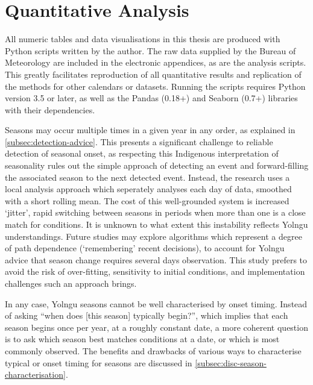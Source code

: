 \section{Quantitative Analysis}

All numeric tables and data visualisations in this thesis are produced
with Python scripts written by the author.  The raw data supplied by the
Bureau of Meteorology are included in the electronic appendices, as
are the analysis scripts.  This greatly facilitates reproduction of all
quantitative results and replication of the methods for other calendars
or datasets.  Running the scripts requires Python version 3.5 or later,
as well as the Pandas (0.18+) and Seaborn (0.7+) libraries with their
dependencies.

Seasons may occur multiple times in a given year in any order, as explained
in \cref{subsec:detection-advice}.  This presents a significant
challenge to reliable detection of seasonal onset, as respecting this
Indigenous interpretation of seasonality rules out
the simple approach of detecting an event and forward-filling the
associated season to the next detected event.  Instead, the research
uses a local analysis approach which seperately analyses each day of data,
smoothed with a short rolling mean.
%
The cost of this well-grounded system is increased `jitter', rapid
switching between seasons in periods when more than one is a close match
for conditions.  It is unknown to what extent this instability reflects Yolngu understandings.
%
Future studies may explore algorithms which represent a degree of path
dependence (`remembering' recent decisions), to account for Yolngu advice
that season change requires
several days observation.  This study prefers to avoid the risk of
over-fitting, sensitivity to initial conditions, and implementation
challenges such an approach brings.

In any case, Yolngu seasons cannot be well characterised by onset timing.
Instead of asking ``when does [this season] typically begin?'', which implies
that each season begins once per year, at a roughly constant date, a more
coherent question is to ask which season best matches conditions at a date,
or which is most commonly observed.
%
The benefits and drawbacks of various ways to characterise typical or onset
timing for seasons are discussed in \cref{subsec:disc-season-characterisation}.

